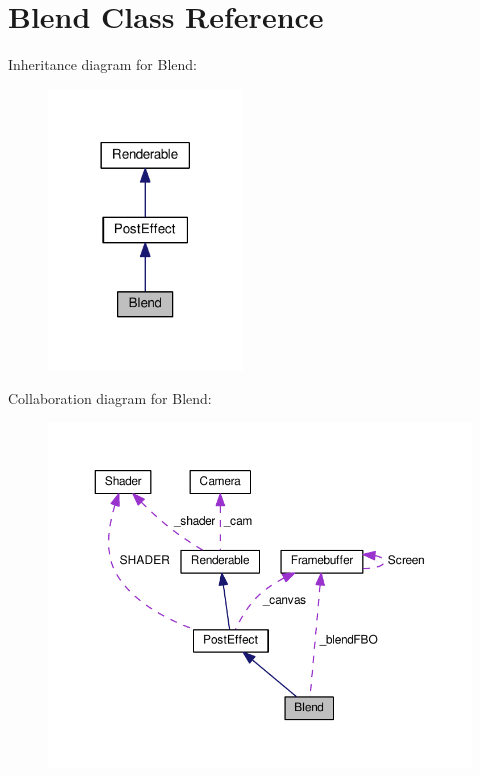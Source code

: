\hypertarget{class_blend}{}\section{Blend Class Reference}
\label{class_blend}


Inheritance diagram for Blend\+:\nopagebreak
\begin{figure}[H]
\begin{center}
\leavevmode
\includegraphics[width=146pt]{class_blend__inherit__graph}
\end{center}
\end{figure}


Collaboration diagram for Blend\+:\nopagebreak
\begin{figure}[H]
\begin{center}
\leavevmode
\includegraphics[width=350pt]{class_blend__coll__graph}
\end{center}
\end{figure}
